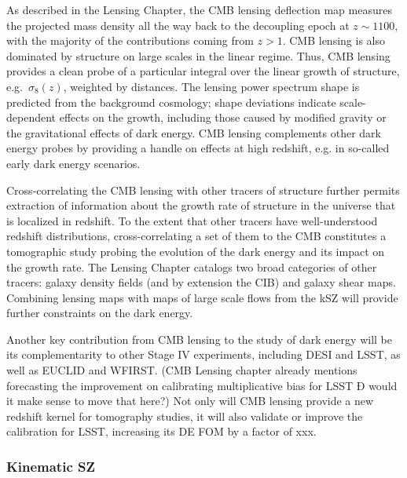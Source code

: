As described in the Lensing Chapter, the CMB lensing deflection map measures the projected mass density all the way back to the decoupling epoch at $z \sim 1100$, with the majority of the contributions coming from $z > 1$.  CMB lensing is also dominated by structure on large scales in the linear regime.  Thus,  CMB lensing provides a clean probe of a particular integral over the linear growth of structure,
e.g.~$\sigma_8(z)$,
weighted by distances. The lensing power spectrum shape is predicted from the background cosmology; shape deviations indicate scale-dependent effects on the growth, including those caused by modified gravity or the 
gravitational effects of dark energy.  CMB lensing complements other dark energy probes by providing
a handle on effects at high redshift, e.g. in so-called early dark energy scenarios.

Cross-correlating the CMB lensing with other tracers of structure further permits extraction of information about the growth rate of structure in the universe that is localized in redshift.  To the extent that other tracers have well-understood redshift distributions, cross-correlating a set of them to the CMB constitutes a tomographic study probing the evolution of the dark energy and its impact on the growth rate. The Lensing Chapter catalogs two broad categories of other tracers: galaxy density fields (and by extension the CIB) and galaxy shear maps. Combining lensing maps with maps of large scale flows from the kSZ will provide further constraints on the dark energy.

Another key contribution from CMB lensing to the study of dark energy will be its complementarity to other Stage IV experiments, including DESI and LSST, as well as EUCLID and WFIRST. (CMB Lensing chapter already mentions forecasting the improvement on calibrating multiplicative bias for LSST Ð would it make sense to move that here?) Not only will CMB lensing provide a new redshift kernel for tomography studies, it will also validate or improve the calibration for LSST, increasing its DE FOM by a factor of xxx.




\subsubsection{Kinematic SZ}

